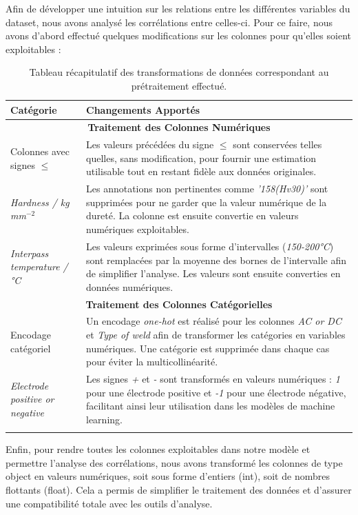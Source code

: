 \documentclass{article}
\begin{document}
Afin de développer une intuition sur les relations entre les différentes variables du dataset, nous avons analysé les corrélations entre celles-ci. Pour ce faire, nous avons d’abord effectué quelques modifications sur les colonnes pour qu'elles soient exploitables :

\begin{longtable}{|p{4cm}|p{10cm}|}
\hline
\textbf{Catégorie} & \textbf{Changements Apportés} \\ \hline
\multicolumn{2}{|c|}{\textbf{Traitement des Colonnes Numériques}} \\ \hline
Colonnes avec signes $\leq$ & Les valeurs précédées du signe $\leq$ sont conservées telles quelles, sans modification, pour fournir une estimation utilisable tout en restant fidèle aux données originales. \\ \hline
\textit{Hardness / kg mm$^{-2}$} & Les annotations non pertinentes comme \textit{'158(Hv30)'} sont supprimées pour ne garder que la valeur numérique de la dureté. La colonne est ensuite convertie en valeurs numériques exploitables. \\ \hline
\textit{Interpass temperature / °C} & Les valeurs exprimées sous forme d’intervalles (\textit{150-200°C}) sont remplacées par la moyenne des bornes de l'intervalle afin de simplifier l'analyse. Les valeurs sont ensuite converties en données numériques. \\ \hline

\multicolumn{2}{|c|}{\textbf{Traitement des Colonnes Catégorielles}} \\ \hline
Encodage catégoriel & Un encodage \textit{one-hot} est réalisé pour les colonnes \textit{AC or DC} et \textit{Type of weld} afin de transformer les catégories en variables numériques. Une catégorie est supprimée dans chaque cas pour éviter la multicollinéarité. \\ \hline
\textit{Electrode positive or negative} & Les signes \textit{+} et \textit{-} sont transformés en valeurs numériques : \textit{1} pour une électrode positive et \textit{-1} pour une électrode négative, facilitant ainsi leur utilisation dans les modèles de machine learning. \\ \hline

\caption{Tableau récapitulatif des transformations de données correspondant au prétraitement effectué.}
\end{longtable}

Enfin, pour rendre toutes les colonnes exploitables dans notre modèle et permettre l'analyse des corrélations, nous avons transformé les colonnes de type object en valeurs numériques, soit sous forme d'entiers (int), soit de nombres flottants (float). Cela a permis de simplifier le traitement des données et d'assurer une compatibilité totale avec les outils d'analyse.\\
\end{document}
